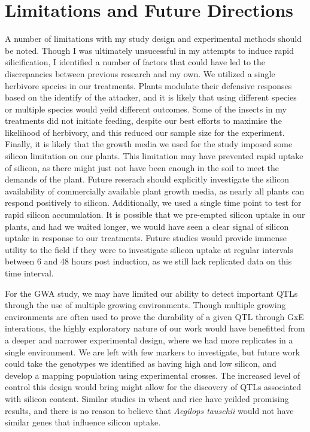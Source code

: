 \documentclass[12pt, letterpaper, ]{report}
\begin{document}
\section{Limitations and Future Directions}

A number of limitations with my study design and experimental methods should be noted. Though I was ultimately unsucessful in my attempts to induce rapid silicification, I identified a number of factors that could have led to the discrepancies between previous research and my own. We utilized a single herbivore species in our treatments. Plants modulate their defensive responses based on the identify of the attacker, and it is likely that using different species or multiple species would yeild different outcomes. Some of the insects in my treatments did not initiate feeding, despite our best efforts to maximise the likelihood of herbivory, and this reduced our sample size for the experiment. Finally, it is likely that the growth media we used for the study imposed some silicon limitation on our plants. This limitation may have prevented rapid uptake of silicon, as there might just not have been enough in the soil to meet the demands of the plant. Future reserach should explicitly investigate the silicon availability of commercially available plant growth media, as nearly all plants can respond positively to silicon. Additionally, we used a single time point to test for rapid silicon accumulation. It is possible that we pre-empted silicon uptake in our plants, and had we waited longer, we would have seen a clear signal of silicon uptake in response to our treatments. Future studies would provide immense utility to the field if they were to investigate silicon uptake at regular intervals between 6 and 48 hours post induction, as we still lack replicated data on this time interval. 

For the GWA study, we may have limited our ability to detect important QTLs through the use of multiple growing environments. Though multiple growing environments are often used to prove the durability of a given QTL through GxE interations, the highly exploratory nature of our work would have benefitted from a deeper and narrower experimental design, where we had more replicates in a single environment. We are left with few markers to investigate, but future work could take the genotypes we identified as having high and low silicon, and develop a mapping population using experimental crosses. The increased level of control this design would bring might allow for the discovery of QTLs associated with silicon content. Similar studies in wheat and rice have yeilded promising results, and there is no reason to believe that \textit{Aegilops tauschii} would not have similar genes that influence silicon uptake.
\end{document}
